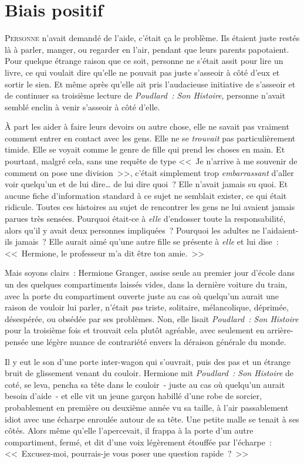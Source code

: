\chapter{Biais positif}

\lettrine{P}{ersonne} n'avait demandé de l'aide, c'était ça le problème. Ils étaient juste restés là à parler, manger, ou regarder en l'air, pendant que leurs parents papotaient. Pour quelque étrange raison que ce soit, personne ne s'était assit pour lire un livre, ce qui voulait dire qu'elle ne pouvait pas juste s'asseoir à côté d'eux et sortir le sien. Et même après qu'elle ait pris l'audacieuse initiative de s'asseoir et de continuer sa troisième lecture de \emph{Poudlard~: Son Histoire}, personne n'avait semblé enclin à venir s'asseoir à côté d'elle.

À part les aider à faire leurs devoirs ou autre chose, elle ne savait pas vraiment comment entrer en contact avec les gens. Elle ne se \emph{trouvait} pas particulièrement timide. Elle se voyait comme le genre de fille qui prend les choses en main. Et pourtant, malgré cela, sans une requête de type <<~Je n'arrive à me souvenir de comment on pose une division~>>, c'était simplement trop \emph{embarrassant} d'aller voir quelqu'un et de lui dire… de lui dire quoi~? Elle n'avait jamais su quoi. Et aucune fiche d'information standard à ce sujet ne semblait exister, ce qui était ridicule. Toutes ces histoires au sujet de rencontrer les gens ne lui avaient jamais parues très sensées. Pourquoi était-ce à \emph{elle} d'endosser toute la responsabilité, alors qu'il y avait deux personnes impliquées~? Pourquoi les adultes ne l'aidaient-ils jamais~? Elle aurait aimé qu'une autre fille se présente à \emph{elle} et lui dise~: <<~Hermione, le professeur m'a dit être ton amie.~>>

Mais soyons clairs~: Hermione Granger, assise seule au premier jour d'école dans un des quelques compartiments laissés vides, dans la dernière voiture du train, avec la porte du compartiment ouverte juste au cas où quelqu'un aurait une raison de vouloir lui parler, n'était \emph{pas} triste, solitaire, mélancolique, déprimée, désespérée, ou obsédée par ses problèmes. Non, elle lisait \emph{Poudlard~: Son Histoire} pour la troisième fois et trouvait cela plutôt agréable, avec seulement en arrière-pensée une légère nuance de contrariété envers la déraison générale du monde.

Il y eut le son d'une porte inter-wagon qui s'ouvrait, puis des pas et un étrange bruit de glissement venant du couloir. Hermione mit \emph{Poudlard~: Son Histoire} de coté, se leva, pencha sa tête dans le couloir~- juste au cas où quelqu'un aurait besoin d'aide~- et elle vit un jeune garçon habillé d’une robe de sorcier, probablement en première ou deuxième année vu sa taille, à l'air passablement idiot avec une écharpe enroulée autour de sa tête. Une petite malle se tenait à ses côtés. Alors même qu'elle l'apercevait, il frappa à la porte d'un autre compartiment, fermé, et dit d'une voix légèrement étouffée par l'écharpe~: <<~Excusez-moi, pourrais-je vous poser une question rapide~?~>>


